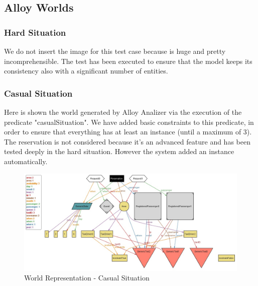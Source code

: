 	\subsection{Alloy Worlds}
		\subsubsection{Hard Situation}
		We do not insert the image for this test case because is huge and
		pretty incomprehensible. The test has been executed to ensure that the
		model keeps its consistency also with a significant number of entities.
		\newpage
		\begin{landscape}
		\subsubsection{Casual Situation}
		Here is shown the world generated by Alloy Analizer via the
		execution of the predicate "casualSituation".
		We have added basic constraints to this predicate, in order to ensure
		that everything has at least an instance (until a maximum of 3).
		The reservation is not considered because it's an advanced feature and
		has been tested deeply in the hard situation. However the system added
		an instance automatically.
			\begin{figure}[!h]
				\begin{center}			
					\includegraphics[height=0.65\textheight]{../SE2_ALLOY/CasualSituation}
					\caption{World Representation - Casual Situation}	
				\end{center}
			\end{figure}
		\end{landscape}
		\newpage
